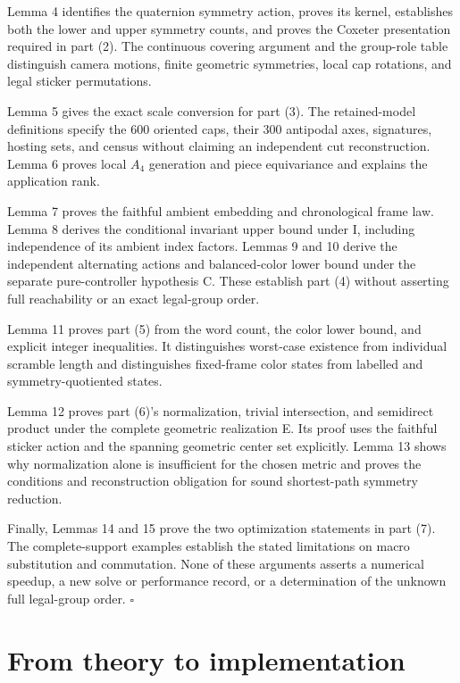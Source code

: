 \documentclass[
  10pt,
  a4paper,
]{article}
\begin{document}
Lemma 4 identifies the quaternion symmetry action, proves its kernel,
establishes both the lower and upper symmetry counts, and proves the
Coxeter presentation required in part (2). The continuous covering
argument and the group-role table distinguish camera motions, finite
geometric symmetries, local cap rotations, and legal sticker
permutations.

Lemma 5 gives the exact scale conversion for part (3). The
retained-model definitions specify the \(600\) oriented caps, their
\(300\) antipodal axes, signatures, hosting sets, and census without
claiming an independent cut reconstruction. Lemma 6 proves local \(A_4\)
generation and piece equivariance and explains the application rank.

Lemma 7 proves the faithful ambient embedding and chronological frame
law. Lemma 8 derives the conditional invariant upper bound under I,
including independence of its ambient index factors. Lemmas 9 and 10
derive the independent alternating actions and balanced-color lower
bound under the separate pure-controller hypothesis C. These establish
part (4) without asserting full reachability or an exact legal-group
order.

Lemma 11 proves part (5) from the word count, the color lower bound, and
explicit integer inequalities. It distinguishes worst-case existence
from individual scramble length and distinguishes fixed-frame color
states from labelled and symmetry-quotiented states.

Lemma 12 proves part (6)'s normalization, trivial intersection, and
semidirect product under the complete geometric realization E. Its proof
uses the faithful sticker action and the spanning geometric center set
explicitly. Lemma 13 shows why normalization alone is insufficient for
the chosen metric and proves the conditions and reconstruction
obligation for sound shortest-path symmetry reduction.

Finally, Lemmas 14 and 15 prove the two optimization statements in part
(7). The complete-support examples establish the stated limitations on
macro substitution and commutation. None of these arguments asserts a
numerical speedup, a new solve or performance record, or a determination
of the unknown full legal-group order. \(\square\) \newpage

\section{From theory to
implementation}\label{from-theory-to-implementation}
\end{document}
